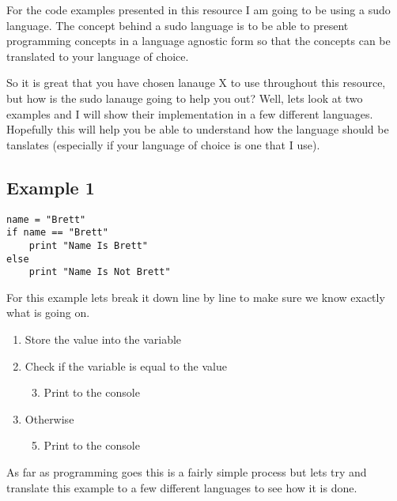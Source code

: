 For the code examples presented in this resource I am going to be using a sudo language.
The concept behind a sudo language is to be able to present programming concepts in a
language agnostic form so that the concepts can be translated to your language of choice.
\par

So it is great that you have chosen lanauge X to use throughout this resource, but how is the sudo lanauge going to help you out?
Well, lets look at two examples and I will show their implementation in a few different languages.
Hopefully this will help you be able to understand how the language should be tanslates (especially if your language of choice
is one that I use).

\subsection{Example 1}

\begin{lstlisting}[caption={Example 1 - Sudo Code}]
name = "Brett"
if name == "Brett"
    print "Name Is Brett"
else
    print "Name Is Not Brett"
\end{lstlisting}

For this example lets break it down line by line to make sure we know exactly what is going on.

\begin{enumerate}
    \item {Store the value  into the variable }
    \item {Check if the variable  is equal to the value }
    \begin{enumerate}
        \setcounter{enumii}{2}
        \item {Print  to the console}
    \end{enumerate}
    \setcounter{enumi}{3}
    \item {Otherwise}
    \begin{enumerate}
        \setcounter{enumii}{4}
        \item {Print  to the console}
    \end{enumerate}
\end{enumerate}

As far as programming goes this is a fairly simple process but lets try and translate this example to a
few different languages to see how it is done.

